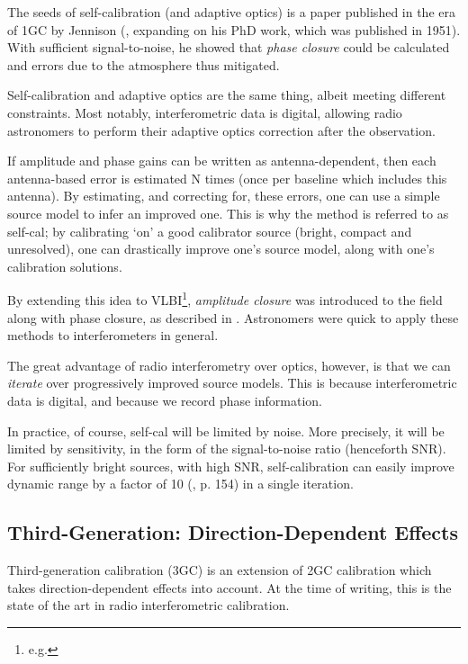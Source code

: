 \pg
The seeds of self-calibration (and adaptive optics) is a paper published in the era of 1GC by Jennison (, expanding on his PhD work, which was published in 1951). With sufficient signal-to-noise, he showed that \emph{phase closure} could be calculated and errors due to the atmosphere thus mitigated.

\pg
Self-calibration and adaptive optics are the same thing, albeit meeting different constraints. Most notably, interferometric data is digital, allowing radio astronomers to perform their adaptive optics correction after the observation.


\pg
If amplitude and phase gains can be written as antenna-dependent, then each antenna-based error is estimated N times (once per baseline which includes this antenna). By estimating, and correcting for, these errors, one can use a simple source model to infer an improved one. This is why the method is referred to as self-cal; by calibrating `on' a good calibrator source (bright, compact and unresolved), one can drastically improve one's source model, along with one's calibration solutions.

\pg
By extending this idea to VLBI\footnote{e.g.  }, \emph{amplitude closure} was introduced to the field along with phase closure, as described in . Astronomers were quick to apply these methods to interferometers in general.

\pg
The great advantage of radio interferometry over optics, however, is that we can \emph{iterate} over progressively improved source models. This is because interferometric data is digital, and because we record phase information.

\pg
In practice, of course, self-cal will be limited by noise. More precisely, it will be limited by sensitivity, in the form of the signal-to-noise ratio (henceforth SNR). For sufficiently bright sources, with high SNR, self-calibration can easily improve dynamic range by a factor of 10 (\cite{serendipitous}, p. 154) in a single iteration. 

\subsection{Third-Generation: Direction-Dependent Effects}

\pg
Third-generation calibration (3GC) is an extension of 2GC calibration which takes direction-dependent effects into account. At the time of writing, this is the state of the art in radio interferometric calibration.

